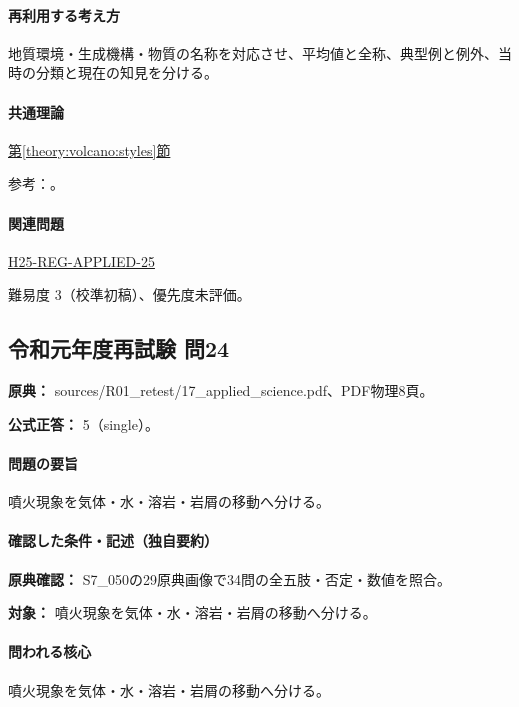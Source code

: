 \paragraph{再利用する考え方} 地質環境・生成機構・物質の名称を対応させ、平均値と全称、典型例と例外、当時の分類と現在の知見を分ける。

\paragraph{共通理論} \hyperref[theory:volcano:styles]{第\ref*{theory:volcano:styles}節}

\par 参考：\cite{jma_magma1999,vol50_styles_ref}。

\paragraph{関連問題} \hyperref[q:h25-reg-applied-25]{H25-REG-APPLIED-25}

\par 難易度 3（校準初稿）、優先度未評価。

\subsection{令和元年度再試験 問24}
\label{q:r01-ret-applied-24}

\noindent\textbf{原典：} sources/R01\_retest/17\_applied\_science.pdf、PDF物理8頁。

\textbf{公式正答：} 5（single）。

\paragraph{問題の要旨} 噴火現象を気体・水・溶岩・岩屑の移動へ分ける。

\paragraph{確認した条件・記述（独自要約）}\mbox{}\par

\noindent\textbf{原典確認：} S7\_050の29原典画像で34問の全五肢・否定・数値を照合。\par

\noindent\textbf{対象：} 噴火現象を気体・水・溶岩・岩屑の移動へ分ける。\par

\paragraph{問われる核心} 噴火現象を気体・水・溶岩・岩屑の移動へ分ける。

